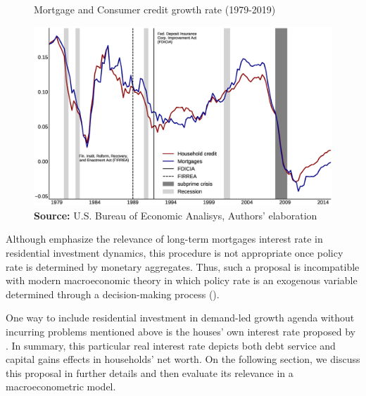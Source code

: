 \begin{figure}[htb]
	\centering
	\caption{Mortgage and Consumer credit growth rate (1979-2019)}
	\label{Fig:CreditFDICIA}
	\includegraphics[width=\textwidth]{./figs/FDICIA.eps}
	\caption*{\textbf{Source:} U.S. Bureau of Economic Analisys, Authors' elaboration}
\end{figure}
Although \textcite{gauger_residential_2003} emphasize the relevance of long-term mortgages interest rate in residential investment dynamics, this procedure is not appropriate once policy rate is determined by monetary aggregates.
Thus, such a proposal is incompatible with modern macroeconomic theory in which policy rate is an exogenous variable determined through a decision-making process (\cite[p.~230--256]{lavoie_post-keynesian_2015}).

One way to include residential investment in demand-led growth agenda without incurring problems mentioned above is the houses' own interest rate proposed by \textcite{teixeira_crescimento_2015}.
In summary, this particular real interest rate depicts both debt service and capital gains effects in households' net worth.
On the following section, we discuss this proposal in further details and then evaluate its relevance in a macroeconometric model.

